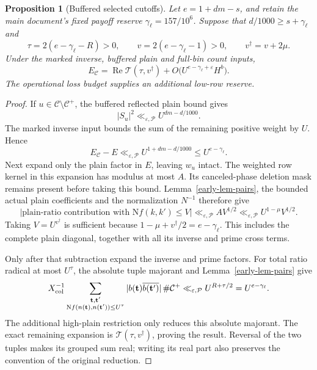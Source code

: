 \documentclass[11pt]{article}
\newtheorem{proposition}[theorem]{Proposition}
\theoremstyle{definition}
\newcommand{\N}{\mathrm N}
\newcommand{\eps}{\varepsilon}
\newcommand{\Cplus}{\mathcal C^+}
\newcommand{\lls}{\ll_{\eps,\mathcal P}}
\begin{document}
\begin{proposition}[Buffered selected cutoffs]\label{early-prop-cutoffs}
Let \(e=1+dm-s\), and retain the main document's fixed payoff reserve
\(\gamma_\ell=157/10^6\).  Suppose that
\(d/1000\ge s+\gamma_\ell\) and
\[
 \tau=2(e-\gamma_\ell-R)>0,\qquad
 v=2(e-\gamma_\ell-1)>0,\qquad v^\dagger=v+2\mu.
\]
Under the marked inverse, buffered plain and full-bin count inputs,
\begin{equation}\label{early-eq-cutoff-result}
 E_{\mathcal C}
   =\operatorname{Re}\mathcal T(\tau,v^\dagger)
      +O\bigl(U^{e-\gamma_\ell+\eps}H^b\bigr).
\end{equation}
The operational loss budget supplies an additional low-row reserve.
\end{proposition}

\begin{proof}
If \(u\in\mathcal C\setminus\Cplus\), the buffered reflected
plain bound gives
\[
 |S_u|^2\lls U^{dm-d/1000}.
\]
The marked inverse input bounds the sum of the remaining positive
weight by \(U\).  Hence
\[
 E_{\mathcal C}-E\lls U^{1+dm-d/1000}
                          \le U^{e-\gamma_\ell}.
\]
Next expand only the plain factor in \(E\), leaving \(w_u\) intact.
The weighted row kernel in this expansion has modulus at most \(A\).
Its canceled-phase deletion mask remains present before taking this
bound.  Lemma~\ref{early-lem-pairs}, the bounded actual plain
coefficients and the normalization \(N^{-1}\) therefore give
\begin{equation}\label{early-eq-small-plain}
 |\text{plain-ratio contribution with }\N f(k,k')\le V|
       \lls A V^{1/2}\lls U^{1-\mu}V^{1/2}.
\end{equation}
Taking \(V=U^{v^\dagger}\) is sufficient because
\(1-\mu+v^\dagger/2=e-\gamma_\ell\).
This includes the complete plain diagonal, together with all its inverse
and prime cross terms.

Only after that subtraction expand the inverse and prime factors.
For total ratio radical at most \(U^\tau\), the absolute tuple
majorant and Lemma~\ref{early-lem-pairs} give
\[
 X_{\rm col}^{-1}
       \sum_{\substack{\mathbf t,\mathbf t'\\
                       \N f(n(\mathbf t),n(\mathbf t'))\le U^\tau}}
       |b(\mathbf t)\overline{b(\mathbf t')}|\,
                  \#\Cplus
       \lls U^{R+\tau/2}=U^{e-\gamma_\ell}.
\]
The additional high-plain restriction only reduces this absolute
majorant.  The exact remaining expansion is
\(\mathcal T(\tau,v^\dagger)\), proving the result.  Reversal of the
two tuples makes its grouped sum real; writing its real part also
preserves the convention of the original reduction.
\end{proof}
\end{document}
